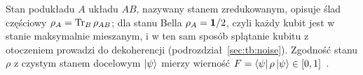 Stan podukładu $A$ układu $AB$, nazywany stanem zredukowanym, opisuje ślad częściowy $\rho_A=\operatorname{Tr}_B\rho_{AB}$; dla stanu Bella $\rho_A=\mathbf{1}/2$, czyli każdy kubit jest w stanie maksymalnie mieszanym, i w ten sam sposób splątanie kubitu z otoczeniem prowadzi do dekoherencji (podrozdział~\ref{sec:tb:noise}).
Zgodność stanu $\rho$ z czystym stanem docelowym $\ket{\psi}$ mierzy wierność $F=\bra{\psi}\rho\ket{\psi}\in[0,1]$~\cite{jozsa_fidelity_1994}.
